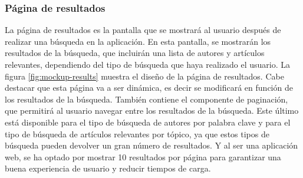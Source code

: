 \subsubsection{Página de resultados}
La página de resultados es la pantalla que se mostrará al usuario después de realizar una búsqueda en la aplicación.
En esta pantalla, se mostrarán los resultados de la búsqueda, que incluirán una lista de autores y artículos relevantes, dependiendo del tipo de búsqueda que haya realizado el usuario.
La figura \ref{fig:mockup-results} muestra el diseño de la página de resultados. Cabe destacar que esta página va a ser dinámica, es decir se modificará en función de los resultados de la búsqueda.
También contiene el componente de paginación, que permitirá al usuario navegar entre los resultados de la búsqueda. Este último está disponible para el tipo de búsqueda de autores por palabra clave y para el tipo de búsqueda de artículos relevantes por tópico, ya que estos tipos de búsqueda pueden devolver un gran número de resultados. Y al ser una aplicación web, se ha optado por mostrar 10 resultados por página para garantizar una buena experiencia de usuario y reducir tiempos de carga.

